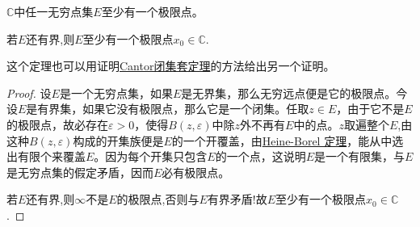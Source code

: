 \documentclass[../../main.tex]{subfiles}%
\begin{document}
\begin{theorem}\label{theorem:Bolzano-Weierstrass定理}
$\mathbb{C}$中任一无穷点集$E$至少有一个极限点。

若$E$还有界,则$E$至少有一个极限点$x_0\in \mathbb{C}$.
\end{theorem}
\begin{remark}
这个定理也可以用证明\hyperref[theorem:复变函数--Cantor闭集套定理]{Cantor闭集套定理}的方法给出另一个证明。
\end{remark}
\begin{proof}
设\(E\)是一个无穷点集，如果\(E\)是无界集，那么无穷远点便是它的极限点。今设\(E\)是有界集，如果它没有极限点，那么它是一个闭集。任取\(z \in E\)，由于它不是\(E\)的极限点，故必存在\(\varepsilon > 0\)，使得\(B(z, \varepsilon)\)中除\(z\)外不再有\(E\)中的点。$z$取遍整个$E$,由这种\(B(z, \varepsilon)\)构成的开集族便是\(E\)的一个开覆盖，由\hyperref[theorem:Heine-Borel定理]{Heine-Borel 定理}，能从中选出有限个来覆盖\(E\)。因为每个开集只包含\(E\)的一个点，这说明\(E\)是一个有限集，与\(E\)是无穷点集的假定矛盾，因而\(E\)必有极限点。

若$E$还有界,则$\infty$不是$E$的极限点,否则与$E$有界矛盾!故$E$至少有一个极限点$x_0\in \mathbb{C}$.
\end{proof}
\end{document}
